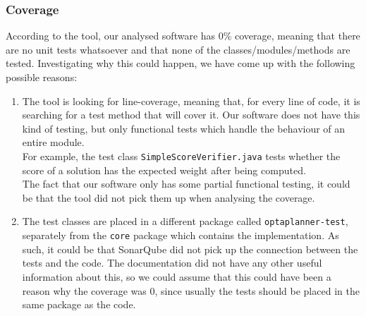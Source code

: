         \subsubsection{Coverage}
            According to the tool, our analysed software has 0\% coverage, meaning that there are no unit tests whatsoever and that none of the classes/modules/methods are tested. Investigating why this could happen, we have come up with the following possible reasons:
            \begin{enumerate}
                \item The tool is looking for line-coverage, meaning that, for every line of code, it is searching for a test method that will cover it. Our software does not have this kind of testing, but only functional tests which handle the behaviour of an entire module. \\
                For example, the test class \texttt{SimpleScoreVerifier.java} tests whether the score of a solution has the expected weight after being computed. \\
                The fact that our software only has some partial functional testing, it could be that the tool did not pick them up when analysing the coverage.
                \item The test classes are placed in a different package called \texttt{optaplanner-test}, separately from the \texttt{core} package which contains the implementation. As such, it could be that SonarQube did not pick up the connection between the tests and the code. The documentation did not have any other useful information about this, so we could assume that this could have been a reason why the coverage was 0, since usually the tests should be placed in the same package as the code.
            \end{enumerate}
            